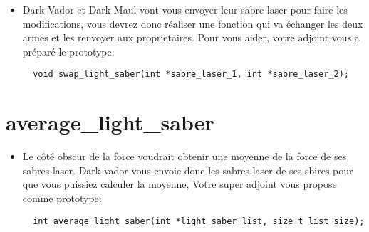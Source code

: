 \documentclass{koala-en}
\begin{document}

\begin{itemize}
  \item
Dark Vador et Dark Maul vont vous envoyer leur sabre laser pour faire les modifications, vous devrez donc réaliser une fonction qui va échanger les deux armes et les renvoyer aux proprietaires. Pour vous aider, votre adjoint vous a préparé le prototype:
\begin{lstlisting}
  void swap_light_saber(int *sabre_laser_1, int *sabre_laser_2);
\end{lstlisting}
\end{itemize}
\newpage

\chapter{average\_light\_saber}


\begin{itemize}
  \item
Le côté obscur de la force voudrait obtenir une moyenne de la force de ses sabres laser. Dark vador vous envoie donc les sabres laser de ses sbires pour que vous puissiez calculer la
moyenne, Votre super adjoint vous propose comme prototype:
\begin{lstlisting}
  int average_light_saber(int *light_saber_list, size_t list_size);
\end{lstlisting}
\end{itemize}
\end{document}
